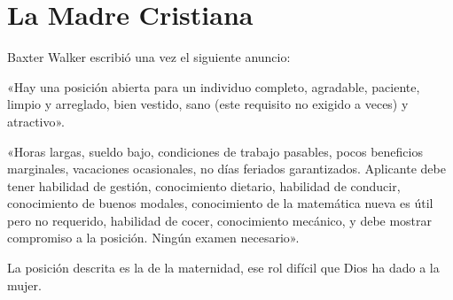 \documentclass[12pt, twoside, openright]{book}
\begin{document}
\section{La Madre Cristiana}
Baxter Walker escribió una vez el siguiente anuncio:

«Hay una posición abierta para un individuo completo, agradable, paciente, limpio y arreglado, bien vestido, sano (este requisito no exigido a veces) y atractivo».

«Horas largas, sueldo bajo, condiciones de trabajo pasables, pocos beneficios marginales, vacaciones ocasionales, no días feriados garantizados. Aplicante debe tener habilidad de gestión, conocimiento dietario, habilidad de conducir, conocimiento de buenos modales, conocimiento de la matemática nueva es útil pero no requerido, habilidad de cocer, conocimiento mecánico, y debe mostrar compromiso a la posición. Ningún examen necesario».

La posición descrita es la de la maternidad, ese rol difícil que Dios ha dado a la mujer.
\end{document}
